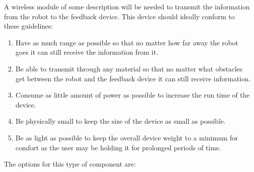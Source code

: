 A wireless module of some description will be needed to transmit the information from the robot to the feedback device.  This device should ideally conform to these guidelines:
\begin{enumerate}
\item Have as much range as possible so that no matter how far away the robot goes it can still receive the information from it.
\item Be able to transmit through any material so that no matter what obstacles get between the robot and the feedback device it can still receive information.
\item Consume as little amount of power as possible to increase the run time of the device.
\item Be physically small to keep the size of the device as small as possible.
\item Be as light as possible to keep the overall device weight to a minimum for comfort as the user may be holding it for prolonged periods of time.
\end{enumerate}
The options for this type of component are:
